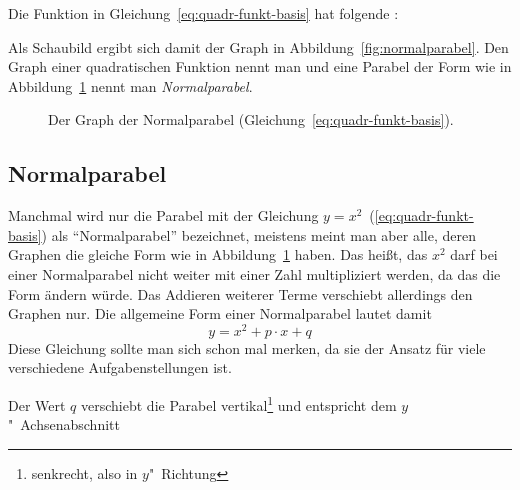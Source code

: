 \documentclass[load-fonts,babel=ngerman]{arbeitsblatt}
\begin{document}
Die Funktion in Gleichung~\vref{eq:quadr-funkt-basis} hat folgende
:

\begin{center}
\end{center}

Als Schaubild ergibt sich damit der Graph in
Abbildung~\vref{fig:normalparabel}.  Den Graph einer quadratischen Funktion
nennt man  und eine Parabel der Form wie in
Abbildung~\ref{fig:normalparabel} nennt man \emph{Normalparabel}.

\begin{figure}
  \centering
  \caption{Der Graph der Normalparabel
    (Gleichung~\ref{eq:quadr-funkt-basis}).}
  \label{fig:normalparabel}
\end{figure}

\subsection{Normalparabel}
Manchmal wird nur die Parabel mit der Gleichung
$y=x^2$~(\ref{eq:quadr-funkt-basis}) als "`Normalparabel"' bezeichnet,
meistens meint man aber alle, deren Graphen die gleiche Form wie in
Abbildung~\ref{fig:normalparabel} haben.  Das heißt, das $x^2$ darf bei einer
Normalparabel nicht weiter mit einer Zahl multipliziert werden, da das die
Form ändern würde.  Das Addieren weiterer Terme verschiebt allerdings den
Graphen nur.  Die allgemeine Form einer Normalparabel lautet damit
\begin{equation}
  \label{eq:normalparabel}
    y = x^2 + p\cdot x + q
\end{equation}
Diese Gleichung sollte man sich schon mal merken, da sie der Ansatz für viele
verschiedene Aufgabenstellungen ist.

Der Wert $q$ verschiebt die Parabel vertikal\footnote{senkrecht, also in
  $y$"~Richtung} und entspricht dem $y$"~Achsenabschnitt
\end{document}
